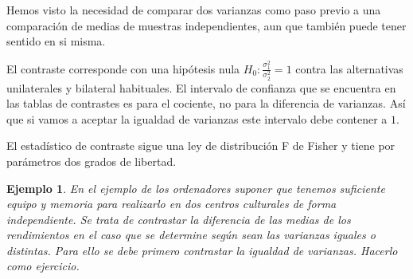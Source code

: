 \documentclass[12pt]{report}
\newtheorem{example}[definition]{Ejemplo}
\begin{document}
Hemos visto la necesidad de comparar dos varianzas como paso previo a una comparación de medias de muestras independientes, aun que también puede tener sentido en si misma.

El contraste corresponde  con una hipótesis nula $H_0: \frac{\sigma^2_1}{\sigma_2^2}=1$ contra las alternativas unilaterales y bilateral habituales. El intervalo de confianza que se  encuentra en las tablas de contrastes es para el cociente, no para la diferencia de varianzas. Así que si  vamos a aceptar la igualdad de varianzas este intervalo debe contener a $1$.

El estadístico de contraste sigue una ley de distribución F de Fisher y tiene por parámetros dos grados de libertad.



\begin{example}
En el ejemplo de los ordenadores suponer que tenemos suficiente equipo y memoria para realizarlo en dos centros culturales de forma independiente. Se trata de contrastar la diferencia de las medias de los rendimientos en el caso que se determine según sean las varianzas iguales o distintas. Para ello se debe primero contrastar la igualdad de varianzas. Hacerlo como ejercicio.









\end{example}
\end{document}
